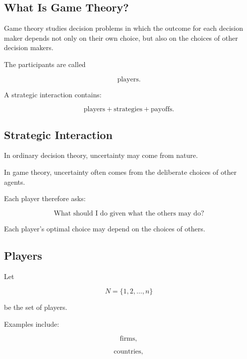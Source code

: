 \subsection{What Is Game Theory?}
\label{subsec:what-is-game-theory}

Game theory studies decision problems in which the outcome for each
decision maker depends not only on their own choice, but also on the
choices of other decision makers.

The participants are called

\[
\boxed{
\text{players}.
}
\]

A strategic interaction contains:

\[
\boxed{
\text{players}
+
\text{strategies}
+
\text{payoffs}.
}
\]

\subsection{Strategic Interaction}
\label{subsec:strategic-interaction}

In ordinary decision theory, uncertainty may come from nature.

In game theory, uncertainty often comes from the deliberate choices of
other agents.

Each player therefore asks:

\[
\boxed{
\text{What should I do given what the others may do?}
}
\]

Each player's optimal choice may depend on the choices of others.

\subsection{Players}
\label{subsec:game-theory-players}

Let

\[
\boxed{
N
=
\{1,2,\ldots,n\}
}
\]

be the set of players.

Examples include:

\[
\boxed{
\text{firms},
}
\]

\[
\boxed{
\text{countries},
}
\]

